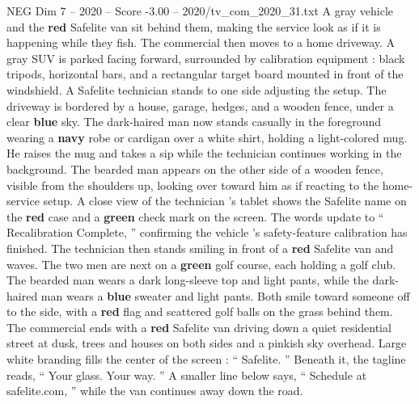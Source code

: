 \begin{textsample}{NEG Dim 7 – 2020 – Score -3.00 – 2020/tv\_com\_2020\_31.txt}
A gray vehicle and the \textbf{red} Safelite van sit behind them, making the service look as if it is happening while they fish.
The commercial then moves to a home driveway.
A gray SUV is parked facing forward, surrounded by calibration equipment : black tripods, horizontal bars, and a rectangular target board mounted in front of the windshield.
A Safelite technician stands to one side adjusting the setup.
The driveway is bordered by a house, garage, hedges, and a wooden fence, under a clear \textbf{blue} sky.
The dark-haired man now stands casually in the foreground wearing a \textbf{navy} robe or cardigan over a white shirt, holding a light-colored mug.
He raises the mug and takes a sip while the technician continues working in the background.
The bearded man appears on the other side of a wooden fence, visible from the shoulders up, looking over toward him as if reacting to the home-service setup.
A close view of the technician ’s tablet shows the Safelite name on the \textbf{red} case and a \textbf{green} check mark on the screen.
The words update to “ Recalibration Complete, ” confirming the vehicle ’s safety-feature calibration has finished.
The technician then stands smiling in front of a \textbf{red} Safelite van and waves.
The two men are next on a \textbf{green} golf course, each holding a golf club.
The bearded man wears a dark long-sleeve top and light pants, while the dark-haired man wears a \textbf{blue} sweater and light pants.
Both smile toward someone off to the side, with a \textbf{red} flag and scattered golf balls on the grass behind them.
The commercial ends with a \textbf{red} Safelite van driving down a quiet residential street at dusk, trees and houses on both sides and a pinkish sky overhead.
Large white branding fills the center of the screen : “ Safelite. ” Beneath it, the tagline reads, “ Your glass.
Your way. ” A smaller line below says, “ Schedule at safelite.com, ” while the van continues away down the road.

\end{textsample}
